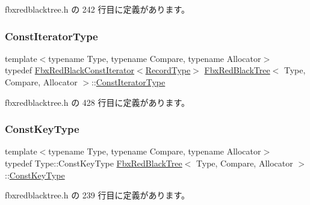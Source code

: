  fbxredblacktree.\+h の 242 行目に定義があります。

\mbox{\label{class_fbx_red_black_tree_a7309ae5e1bb24e7e3da94fef975d10c4}} 
\subsubsection{\texorpdfstring{Const\+Iterator\+Type}{ConstIteratorType}}
{\footnotesize\ttfamily template$<$typename Type, typename Compare, typename Allocator$>$ \\
typedef \hyperlink{class_fbx_red_black_const_iterator}{Fbx\+Red\+Black\+Const\+Iterator}$<$\hyperlink{class_fbx_red_black_tree_1_1_record_type}{Record\+Type}$>$ \hyperlink{class_fbx_red_black_tree}{Fbx\+Red\+Black\+Tree}$<$ Type, Compare, Allocator $>$\+::\hyperlink{class_fbx_red_black_tree_a7309ae5e1bb24e7e3da94fef975d10c4}{Const\+Iterator\+Type}}



 fbxredblacktree.\+h の 428 行目に定義があります。

\mbox{\label{class_fbx_red_black_tree_ad0aa82c0fd952b04edb550fc1fb36a32}} 
\subsubsection{\texorpdfstring{Const\+Key\+Type}{ConstKeyType}}
{\footnotesize\ttfamily template$<$typename Type, typename Compare, typename Allocator$>$ \\
typedef Type\+::\+Const\+Key\+Type \hyperlink{class_fbx_red_black_tree}{Fbx\+Red\+Black\+Tree}$<$ Type, Compare, Allocator $>$\+::\hyperlink{class_fbx_red_black_tree_ad0aa82c0fd952b04edb550fc1fb36a32}{Const\+Key\+Type}}



 fbxredblacktree.\+h の 239 行目に定義があります。

\mbox{\label{class_fbx_red_black_tree_a60ce913af196ee4cf886585363c4b0ca}} 
